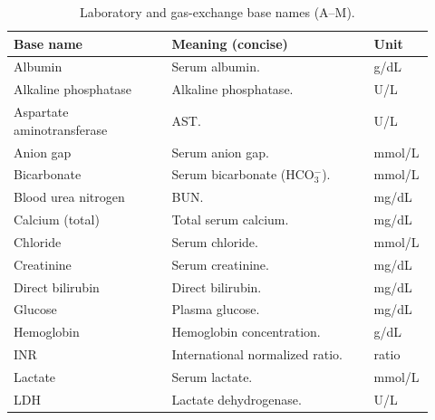 \vspace{0.75\baselineskip}
\begin{table}[t]\centering
{\small\renewcommand{\arraystretch}{1.12}\setlength{\tabcolsep}{6pt}%
\caption{Laboratory and gas-exchange base names (A--M).}
\label{app:tab-labs-a-m}
\begin{tabular}{P{0.36\linewidth} P{0.46\linewidth} P{0.10\linewidth}}
\toprule
\textbf{Base name} & \textbf{Meaning (concise)} & \textbf{Unit}\\
\midrule
Albumin & Serum albumin. & g/dL\\
Alkaline phosphatase & Alkaline phosphatase. & U/L\\
Aspartate aminotransferase & AST. & U/L\\
Anion gap & Serum anion gap. & mmol/L\\
Bicarbonate & Serum bicarbonate (HCO$_3^-$). & mmol/L\\
Blood urea nitrogen & BUN. & mg/dL\\
Calcium (total) & Total serum calcium. & mg/dL\\
Chloride & Serum chloride. & mmol/L\\
Creatinine & Serum creatinine. & mg/dL\\
Direct bilirubin & Direct bilirubin. & mg/dL\\
Glucose & Plasma glucose. & mg/dL\\
Hemoglobin & Hemoglobin concentration. & g/dL\\
INR & International normalized ratio. & ratio\\
Lactate & Serum lactate. & mmol/L\\
LDH & Lactate dehydrogenase. & U/L\\
\bottomrule
\end{tabular}}
\end{table}


